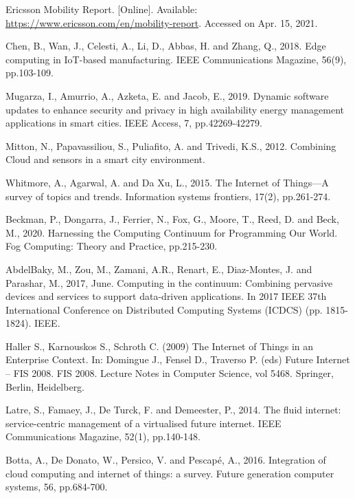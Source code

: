 \begin{thebibliography}{00}

 Ericsson Mobility Report. [Online]. Available: \url{https://www.ericsson.com/en/mobility-report}. Accessed on Apr. 15, 2021.

 Chen, B., Wan, J., Celesti, A., Li, D., Abbas, H. and Zhang, Q., 2018. Edge computing in IoT-based manufacturing. IEEE Communications Magazine, 56(9), pp.103-109.

 Mugarza, I., Amurrio, A., Azketa, E. and Jacob, E., 2019. Dynamic software updates to enhance security and privacy in high availability energy management applications in smart cities. IEEE Access, 7, pp.42269-42279.

 Mitton, N., Papavassiliou, S., Puliafito, A. and Trivedi, K.S., 2012. Combining Cloud and sensors in a smart city environment.

 Whitmore, A., Agarwal, A. and Da Xu, L., 2015. The Internet of Things—A survey of topics and trends. Information systems frontiers, 17(2), pp.261-274.

 Beckman, P., Dongarra, J., Ferrier, N., Fox, G., Moore, T., Reed, D. and Beck, M., 2020. Harnessing the Computing Continuum for Programming Our World. Fog Computing: Theory and Practice, pp.215-230.

 AbdelBaky, M., Zou, M., Zamani, A.R., Renart, E., Diaz-Montes, J. and Parashar, M., 2017, June. Computing in the continuum: Combining pervasive devices and services to support data-driven applications. In 2017 IEEE 37th International Conference on Distributed Computing Systems (ICDCS) (pp. 1815-1824). IEEE.

 Haller S., Karnouskos S., Schroth C. (2009) The Internet of Things in an Enterprise Context. In: Domingue J., Fensel D., Traverso P. (eds) Future Internet – FIS 2008. FIS 2008. Lecture Notes in Computer Science, vol 5468. Springer, Berlin, Heidelberg.

 Latre, S., Famaey, J., De Turck, F. and Demeester, P., 2014. The fluid internet: service-centric management of a virtualised future internet. IEEE Communications Magazine, 52(1), pp.140-148.

 Botta, A., De Donato, W., Persico, V. and Pescapé, A., 2016. Integration of cloud computing and internet of things: a survey. Future generation computer systems, 56, pp.684-700.


\end{thebibliography}
